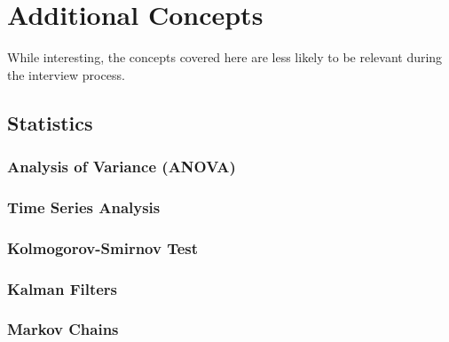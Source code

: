 \chapter{Additional Concepts}
\label{additional}

While interesting, the concepts covered here are less likely
to be relevant during the interview process.

\section{Statistics}
\label{additional:stats}

\subsection{Analysis of Variance (ANOVA)}
\label{additional:stats:ANOVA}

\subsection{Time Series Analysis}
\label{additional:stats:time_series_ana}

\subsection{Kolmogorov-Smirnov Test}
\label{additional:misc:KS_test}

\subsection{Kalman Filters}
\label{additional:misc:kalman_filters}

\subsection{Markov Chains}
\label{additional:misc:markov_chains}

